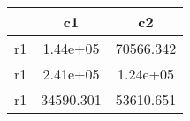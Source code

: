 \begin{table}[htbp]
\begin{tabular}{lcc} \hline \hline
 & c1  & c2  \\  \hline 
r1 &  1.44e+05 & 70566.342 \\  
r1 &  2.41e+05 &  1.24e+05 \\  
r1 & 34590.301 & 53610.651 \\  
\hline \hline \end{tabular}
\end{table}
